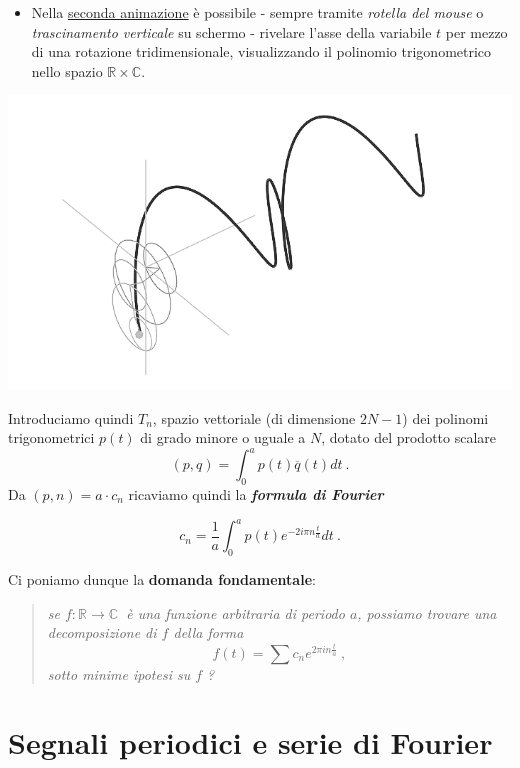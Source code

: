 \documentclass[
]{book}
\providecommand{\tightlist}{%
  \setlength{\itemsep}{0pt}\setlength{\parskip}{0pt}}
\begin{document}
\begin{itemize}
\tightlist
\item
  Nella \href{https://bradwave.github.io/thesis/\#/animazione-polinomi-trigonometrici-3d}{seconda animazione} è possibile - sempre tramite \emph{rotella del mouse} o \emph{trascinamento verticale} su schermo - rivelare l'asse della variabile \(t\) per mezzo di una rotazione tridimensionale, visualizzando il polinomio trigonometrico nello spazio \(\mathbb{R} \times \mathbb{C}\).
\end{itemize}

\begin{center}\includegraphics[width=0.5\linewidth]{_images/pol-3d} \end{center}

Introduciamo quindi \(T_n\), spazio vettoriale (di dimensione \(2N-1\)) dei polinomi trigonometrici \(p(t)\) di grado minore o uguale a \(N\), dotato del prodotto scalare
\[(p,q) = \int_{0}^{a} p(t) \overline{q}(t)dt \ .\]
Da \((p,n)=a\cdot c_n\) ricaviamo quindi la \emph{\textbf{formula di Fourier}}

\begin{equation}
  c_n=\frac{1}{a} \int_{0}^{a}p(t)e^{-2 i \pi n \textstyle \frac {t}{a}}dt \ .
  \label{eq:formulafourier}
\end{equation}

Ci poniamo dunque la \textbf{domanda fondamentale}:

\begin{quote}
\emph{se \(f: \mathbb{R} \longrightarrow \mathbb{C} \ \) è una funzione arbitraria di periodo \(a\), possiamo trovare una decomposizione di \(f\) della forma}
\begin{equation}
f(t) = \sum c_n e^{2 \pi in\textstyle \frac{t}{a}} \ ,
\label{eq:domanda}
\end{equation}
\emph{sotto minime ipotesi su \(f\) ?}
\end{quote}

\hypertarget{seriefourier}{%
\section{Segnali periodici e serie di Fourier}\label{seriefourier}}
\end{document}
